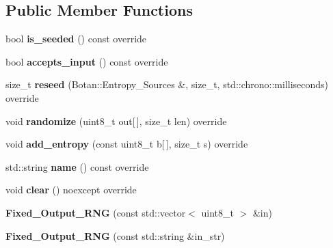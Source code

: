 \subsection*{Public Member Functions}
\begin{DoxyCompactItemize}
\item 
\mbox{\label{class_botan___tests_1_1_fixed___output___r_n_g_a12b55f05356655d410d88755390ec18b}} 
bool {\bfseries is\+\_\+seeded} () const override
\item 
\mbox{\label{class_botan___tests_1_1_fixed___output___r_n_g_a18d3bf359bd47279c4f98655cf534085}} 
bool {\bfseries accepts\+\_\+input} () const override
\item 
\mbox{\label{class_botan___tests_1_1_fixed___output___r_n_g_a4dae9a4d5e6f24a4c4e550b00d82c52e}} 
size\+\_\+t {\bfseries reseed} (Botan\+::\+Entropy\+\_\+\+Sources \&, size\+\_\+t, std\+::chrono\+::milliseconds) override
\item 
\mbox{\label{class_botan___tests_1_1_fixed___output___r_n_g_a0449fad0acc9db2a06d4e1cfdd0b2a8a}} 
void {\bfseries randomize} (uint8\+\_\+t out\mbox{[}$\,$\mbox{]}, size\+\_\+t len) override
\item 
\mbox{\label{class_botan___tests_1_1_fixed___output___r_n_g_a5b823332f1e51d474ac66bb5373098ca}} 
void {\bfseries add\+\_\+entropy} (const uint8\+\_\+t b\mbox{[}$\,$\mbox{]}, size\+\_\+t s) override
\item 
\mbox{\label{class_botan___tests_1_1_fixed___output___r_n_g_a2d968d244bdfb6d0ac12aebe7167450d}} 
std\+::string {\bfseries name} () const override
\item 
\mbox{\label{class_botan___tests_1_1_fixed___output___r_n_g_a681de2c0f75483a001c63bb4fa722bf1}} 
void {\bfseries clear} () noexcept override
\item 
\mbox{\label{class_botan___tests_1_1_fixed___output___r_n_g_a25bab27ecb28f73806cf2bde5a77865c}} 
{\bfseries Fixed\+\_\+\+Output\+\_\+\+R\+NG} (const std\+::vector$<$ uint8\+\_\+t $>$ \&in)
\item 
\mbox{\label{class_botan___tests_1_1_fixed___output___r_n_g_afc1fd1f397db736a3894ac4f485be3b4}} 
{\bfseries Fixed\+\_\+\+Output\+\_\+\+R\+NG} (const std\+::string \&in\+\_\+str)
\end{DoxyCompactItemize}
